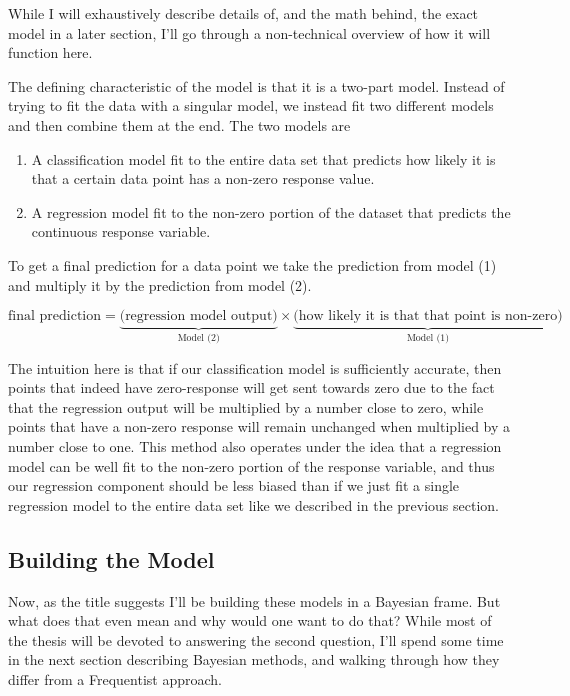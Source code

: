 \documentclass[12pt,twoside]{reedthesis}
\begin{document}
While I will exhaustively describe details of, and the math behind, the exact model in a later section, I'll go through a non-technical overview of how it will function here.

The defining characteristic of the model is that it is a two-part model. Instead of trying to fit the data with a singular model, we instead fit two different models and then combine them at the end. The two models are
\begin{enumerate}
\def\labelenumi{\arabic{enumi}.}
\item
  A classification model fit to the entire data set that predicts how likely it is that a certain data point has a non-zero response value.
\item
  A regression model fit to the non-zero portion of the dataset that predicts the continuous response variable.
\end{enumerate}
To get a final prediction for a data point we take the prediction from model (1) and multiply it by the prediction from model (2).

\[
\text{final prediction} = \underbrace{\bigg(\text{regression model output}\bigg)}_{\text{Model (2)}} \times \underbrace{\bigg(\text{how likely it is that that point is non-zero}\bigg)}_{\text{Model (1)}}
\]

The intuition here is that if our classification model is sufficiently accurate, then points that indeed have zero-response will get sent towards zero due to the fact that the regression output will be multiplied by a number close to zero, while points that have a non-zero response will remain unchanged when multiplied by a number close to one. This method also operates under the idea that a regression model can be well fit to the non-zero portion of the response variable, and thus our regression component should be less biased than if we just fit a single regression model to the entire data set like we described in the previous section.

\hypertarget{building-the-model}{%
\subsection{Building the Model}\label{building-the-model}}

Now, as the title suggests I'll be building these models in a Bayesian frame. But what does that even mean and why would one want to do that? While most of the thesis will be devoted to answering the second question, I'll spend some time in the next section describing Bayesian methods, and walking through how they differ from a Frequentist approach.
\end{document}
